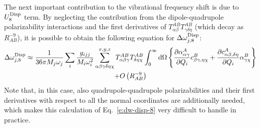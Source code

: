 \documentclass[a4paper,titlepage,twoside,fleqn,12pt]{book}
\newcommand{\fderiv}[2]{\ensuremath{
\frac{\partial #1}{\partial #2}}}
\begin{document}
\begin{refsection}
The next important contribution to the vibrational frequency 
shift is due to $U_{8}^{\rm Disp}$ term. By neglecting the 
contribution from the dipole\hyp{}quadrupole polarizability 
interactions and the first derivatives of $T^{AB}_{\alpha\beta}T^{AB}_{\gamma\delta\eta}$ 
(which decay as $R^{-9}_{AB}$), it is possible to obtain 
the following equation for $\Delta \omega_{j,8}^{\rm Disp}$: 
%
\begin{multline} \label{e:dw-disp-8}
 \Delta\omega_{j,8}^{\rm Disp} \approx 
\frac{1}{36\pi M_j\omega_j}\sum_i \frac{g_{ijj}}{M_i\omega_i^2} 
\sum_{\alpha\beta\gamma\delta\eta\chi}^{x,y,z}   
T^{AB}_{\alpha\beta\gamma}T^{AB}_{\delta\eta\chi}
%
\int_{0}^{\infty} {\rm d}\Omega
 \left\{
\frac{\partial \alpha_{\alpha\gamma}^{A}}{\partial Q_i} c^{B}_{\beta\gamma,\eta\chi}
+
\fderiv{c^{A}_{\alpha\beta,\delta\eta}}{Q_i} \alpha^B_{\gamma\chi}
\right\}  \\
+ O\left( R^{-9}_{AB}\right)
\end{multline}
%
Note that, in this case, also quadrupole\hyp{}quadrupole 
polarizabilities and their first derivatives with respect 
to all the normal coordinates are additionally needed, 
which makes this calculation of Eq.~\eqref{e:dw-disp-8} 
very difficult to handle in practice. 


\end{refsection}
\end{document}
